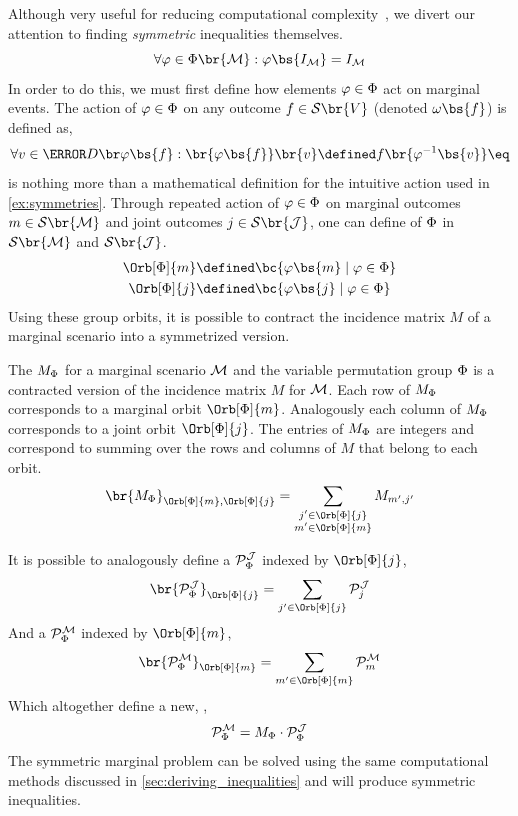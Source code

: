 \documentclass[aps, 10pt, english, twoside, pra, nofootinbib, tightenlines, longbibliography, superscriptaddress]{revtex4-1}
\renewcommand{\Events}[1]{\mathcal{S}\br{#1}} %
\begin{document}
    Although very useful for reducing computational complexity~\cite{Bancal_2010}, we divert our attention to finding \textit{symmetric} inequalities themselves.
    \[ \forall \varphi \in \gp\br{\mscenario} :  \varphi\bs{I_{\mscenario}} = I_{\mscenario} \]
    In order to do this, we must first define how elements $\varphi \in \Phi$ act on marginal events. The action of $\varphi \in \Phi$ on any outcome $f \in \Events{V}$ (denoted $\geo\bs{f}$) is defined as,
    \[ \forall v \in \Dom{\varphi\bs{f}} : \br{\varphi\bs{f}}\br{v} \defined f\br{\varphi^{-1}\bs{v}} \eq \label{eq:act_on_variable}\]
     is nothing more than a mathematical definition for the intuitive action used in \cref{ex:symmetries}.
    Through repeated action of $\varphi \in \Phi$ on marginal outcomes $m \in \Events{\mscenario}$ and joint outcomes $j \in \Events{\jointvar}$, one can define  of $\Phi$ in $\Events{\mscenario}$ and $\Events{\jointvar}$.
    \begin{align*}
        \Orb[\gp]{m} &\defined \bc{\varphi\bs{m} \mid \varphi \in \gp} \\
        \Orb[\gp]{j} &\defined \bc{\varphi\bs{j} \mid \varphi \in \gp}
    \end{align*}
    Using these group orbits, it is possible to contract the incidence matrix $M$ of a marginal scenario into a symmetrized version.

    \begin{definition}
        The  $M_{\Phi}$ for a marginal scenario $\mathcal{M}$ and the variable permutation group $\Phi$ is a contracted version of the incidence matrix $M$ for $\mathcal{M}$. Each row of $M_{\Phi}$ corresponds to a marginal orbit $\Orb[\gp]{m}$. Analogously each column of $M_{\Phi}$ corresponds to a joint orbit $\Orb[\gp]{j}$. The entries of $M_{\Phi}$ are integers and correspond to summing over the rows and columns of $M$ that belong to each orbit.
        \[ \br{M_{\gp}}_{\Orb[\gp]{m}, \Orb[\gp]{j}} = \sum_{\substack{j' \in \Orb[\gp]{j} \\ m' \in \Orb[\gp]{m}}} M_{m',j'} \]
    \end{definition}
    It is possible to analogously define a  $\probvec^{\jointvar}_{\Phi}$ indexed by $\Orb[\gp]{j}$,
    \[ \br{\probvec^{\jointvar}_{\Phi}}_{\Orb[\gp]{j}} = \sum_{j' \in \Orb[\gp]{j}} \probvec^{\jointvar}_{j} \]
    And a  $\probvec^{\mscenario}_{\Phi}$ indexed by $\Orb[\gp]{m}$,
    \[ \br{\probvec^{\mscenario}_{\Phi}}_{\Orb[\gp]{m}} = \sum_{m' \in \Orb[\gp]{m}} \probvec^{\mscenario}_{m} \]
    Which altogether define a new, ,
    \[ \probvec^{\mscenario}_{\Phi} = M_{\gp} \cdot \probvec^{\jointvar}_{\Phi} \]
    The symmetric marginal problem can be solved using the same computational methods discussed in \cref{sec:deriving_inequalities} and will produce symmetric inequalities.
\end{document}
